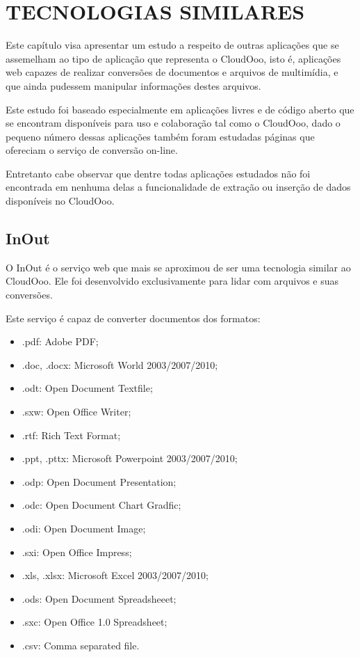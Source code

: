 \chapter{TECNOLOGIAS SIMILARES}
\thispagestyle{empty}

Este capítulo visa apresentar um estudo a respeito de outras aplicações que se assemelham ao tipo de aplicação que representa o CloudOoo, isto é, aplicações web capazes de realizar conversões de documentos e arquivos de multimídia, e que ainda pudessem manipular informações destes arquivos.

Este estudo foi baseado especialmente em aplicações livres e de código aberto que se encontram disponíveis para uso e colaboração tal como o CloudOoo, dado o pequeno número dessas aplicações também foram estudadas páginas que ofereciam o serviço de conversão on-line.

Entretanto cabe observar que dentre todas aplicações estudados não foi encontrada em nenhuma delas a funcionalidade de extração ou inserção de dados disponíveis no CloudOoo.


\section{InOut}

O InOut é o serviço web que mais se aproximou de ser uma tecnologia similar ao CloudOoo. Ele foi desenvolvido exclusivamente para lidar com arquivos e suas conversões.

Este serviço é capaz de converter documentos dos formatos:

\begin{itemize}
    \item{.pdf: Adobe PDF;}
    \item{.doc, .docx: Microsoft World 2003/2007/2010;}
    \item{.odt: Open Document Textfile;}
    \item{.sxw: Open Office Writer;}
    \item{.rtf: Rich Text Format;}
    \item{.ppt, .pttx: Microsoft Powerpoint 2003/2007/2010;}
    \item{.odp: Open Document Presentation;}
    \item{.odc: Open Document Chart Gradfic;}
    \item{.odi: Open Document Image;}
    \item{.sxi: Open Office Impress;}
    \item{.xls, .xlsx: Microsoft Excel 2003/2007/2010;}
    \item{.ods: Open Document Spreadsheeet;}
    \item{.sxc: Open Office 1.0 Spreadsheet;}
    \item{.csv: Comma separated file.}
\end{itemize}


